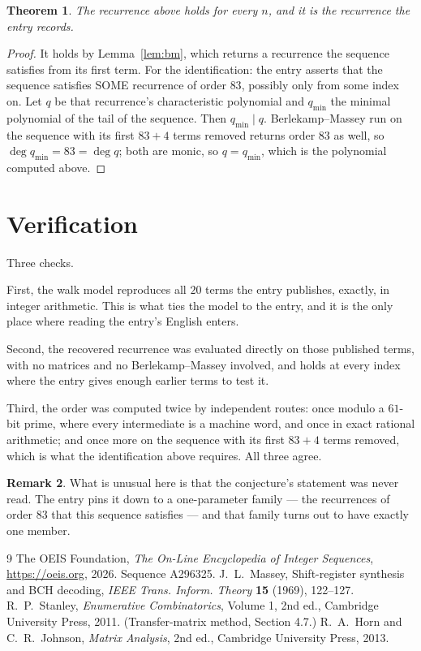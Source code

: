 \documentclass[11pt,a4paper]{article}
\theoremstyle{plain}
\newtheorem{theorem}{Theorem}
\theoremstyle{definition}
\newtheorem{remark}[theorem]{Remark}
\begin{document}
\begin{theorem}
The recurrence above holds for every $n$, and it is the recurrence the entry records.
\end{theorem}

\begin{proof}
It holds by Lemma~\ref{lem:bm}, which returns a recurrence the sequence satisfies from its
first term. For the identification: the entry asserts that the sequence satisfies SOME
recurrence of order $83$, possibly only from some index on. Let $q$ be that recurrence's
characteristic polynomial and $q_{\min}$ the minimal polynomial of the tail of the sequence.
Then $q_{\min}\mid q$. Berlekamp--Massey run on the sequence with its first $83+4$ terms
removed returns order $83$ as well, so $\deg q_{\min}=83=\deg q$; both are monic, so
$q=q_{\min}$, which is the polynomial computed above.
\end{proof}

\section{Verification}

Three checks.

First, the walk model reproduces all $20$ terms the entry publishes, exactly, in integer
arithmetic. This is what ties the model to the entry, and it is the only place where reading
the entry's English enters.

Second, the recovered recurrence was evaluated directly on those published terms, with no
matrices and no Berlekamp--Massey involved, and holds at every index where the entry gives
enough earlier terms to test it.

Third, the order was computed twice by independent routes: once modulo a $61$-bit prime, where
every intermediate is a machine word, and once in exact rational arithmetic; and once more on
the sequence with its first $83+4$ terms removed, which is what the identification above
requires. All three agree.

\begin{remark}
What is unusual here is that the conjecture's statement was never read. The entry pins it down
to a one-parameter family --- the recurrences of order $83$ that this sequence satisfies
--- and that family turns out to have exactly one member.
\end{remark}

\begin{thebibliography}{9}
 The OEIS Foundation, \emph{The On-Line Encyclopedia of Integer
Sequences}, \url{https://oeis.org}, 2026. Sequence A296325.
 J.~L.~Massey, Shift-register synthesis and BCH decoding, \emph{IEEE
Trans. Inform. Theory} \textbf{15} (1969), 122--127.
 R.~P.~Stanley, \emph{Enumerative Combinatorics}, Volume 1, 2nd ed.,
Cambridge University Press, 2011. (Transfer-matrix method, Section 4.7.)
 R.~A.~Horn and C.~R.~Johnson, \emph{Matrix Analysis}, 2nd ed., Cambridge
University Press, 2013.
\end{thebibliography}
\end{document}

